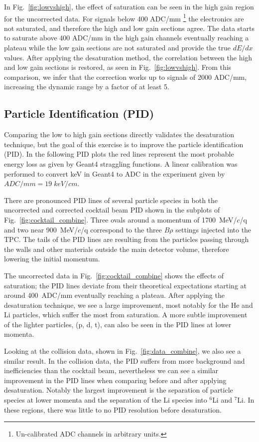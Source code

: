 In Fig.~\ref{fig:lowvshigh}, the effect of saturation can be seen in the high gain region for the uncorrected data. For signals below 400 ADC/mm \footnote{Un-calibrated ADC channels in arbitrary units.} the electronics are not saturated, and therefore the high and low gain sections agree. The data starts to saturate above 400 ADC/mm in the high gain channels eventually reaching a plateau while the low gain sections are not saturated and provide the true $dE/dx$ values.
 After applying the desaturation method, the correlation between the high and low gain sections is restored, as seen in Fig.~\ref{fig:lowvshigh}. From this comparison, we infer that the correction works up to signals of 2000 ADC/mm, increasing the dynamic range by a factor of at least 5.

\subsection{Particle Identification (PID)}


Comparing the low to high gain sections directly validates the desaturation technique, but the goal  of this exercise is to improve the particle identification (PID). In the following PID plots the red lines represent the most probable energy loss as given by Geant4 straggling functions. A linear calibration was performed to convert keV in Geant4 to ADC in the experiment given by $ADC/mm = 19\;keV/cm$.

There are pronounced PID lines of several particle species in both the uncorrected and corrected cocktail beam PID shown in the subplots of Fig.~\ref{fig:cocktail_combine}. Three ovals around a momentum of 1700~MeV/$c$/q and two near 900~MeV/$c$/q correspond to the three $B\rho$ settings injected into the TPC. The tails of the PID lines are resulting from the particles passing through the walls and other materials outside the main detector volume, therefore lowering the initial momentum. 

The uncorrected data in Fig.~\ref{fig:cocktail_combine} shows the effects of saturation; the PID lines deviate from their theoretical expectations starting at around 400~ADC/mm eventually reaching a plateau. After applying the desaturation technique, we see a large improvement, most notably for the He and Li particles, which suffer the most from saturation. A more subtle improvement of the lighter particles, (p, d, t), can also be seen in the PID lines at lower momenta.

Looking at the collision data, shown in Fig.~\ref{fig:data_combine}, we also see a similar result. In the collision data, the PID suffers from more background and inefficiencies than the cocktail beam, nevertheless we can see a similar improvement in the PID lines when comparing before and after applying desaturation. Notably the largest improvement is the separation of particle species at lower momenta and the separation of the Li species into ${}^{6}$Li and ${}^{7}$Li. In these regions, there was little to no PID resolution before desaturation. 

